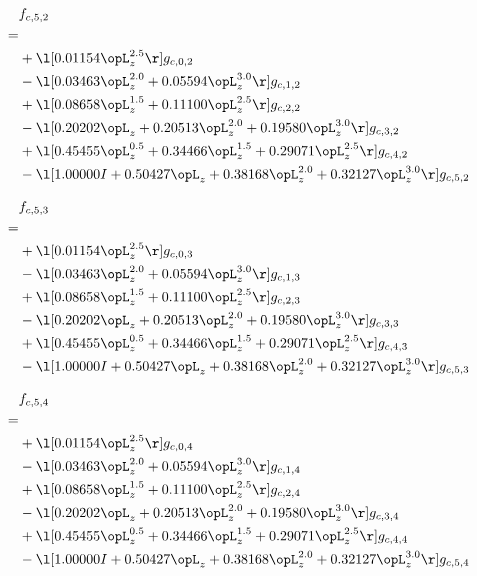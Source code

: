 \begin{alignat}{2} 
\label{eq:f_52_0} 
& f_{c,5,2} \nonumber \\ 
 = \\ 
& + \l[  0.01154 \opL_z^{2.5}  \r] g_{c,0,2} \nonumber \\ 
& - \l[  0.03463 \opL_z^{2.0} +  0.05594 \opL_z^{3.0}  \r] g_{c,1,2} \nonumber \\ 
& + \l[  0.08658 \opL_z^{1.5} +  0.11100 \opL_z^{2.5}  \r] g_{c,2,2} \nonumber \\ 
& - \l[  0.20202 \opL_z +  0.20513 \opL_z^{2.0} +  0.19580 \opL_z^{3.0}  \r] g_{c,3,2} \nonumber \\ 
& + \l[  0.45455 \opL_z^{0.5} +  0.34466 \opL_z^{1.5} +  0.29071 \opL_z^{2.5}  \r] g_{c,4,2} \nonumber \\ 
& - \l[  1.00000 I +  0.50427 \opL_z +  0.38168 \opL_z^{2.0} +  0.32127 \opL_z^{3.0}  \r] g_{c,5,2} \nonumber \\ 
\end{alignat} 


\begin{alignat}{2} 
\label{eq:f_53_0} 
& f_{c,5,3} \nonumber \\ 
 = \\ 
& + \l[  0.01154 \opL_z^{2.5}  \r] g_{c,0,3} \nonumber \\ 
& - \l[  0.03463 \opL_z^{2.0} +  0.05594 \opL_z^{3.0}  \r] g_{c,1,3} \nonumber \\ 
& + \l[  0.08658 \opL_z^{1.5} +  0.11100 \opL_z^{2.5}  \r] g_{c,2,3} \nonumber \\ 
& - \l[  0.20202 \opL_z +  0.20513 \opL_z^{2.0} +  0.19580 \opL_z^{3.0}  \r] g_{c,3,3} \nonumber \\ 
& + \l[  0.45455 \opL_z^{0.5} +  0.34466 \opL_z^{1.5} +  0.29071 \opL_z^{2.5}  \r] g_{c,4,3} \nonumber \\ 
& - \l[  1.00000 I +  0.50427 \opL_z +  0.38168 \opL_z^{2.0} +  0.32127 \opL_z^{3.0}  \r] g_{c,5,3} \nonumber \\ 
\end{alignat} 


\begin{alignat}{2} 
\label{eq:f_54_0} 
& f_{c,5,4} \nonumber \\ 
 = \\ 
& + \l[  0.01154 \opL_z^{2.5}  \r] g_{c,0,4} \nonumber \\ 
& - \l[  0.03463 \opL_z^{2.0} +  0.05594 \opL_z^{3.0}  \r] g_{c,1,4} \nonumber \\ 
& + \l[  0.08658 \opL_z^{1.5} +  0.11100 \opL_z^{2.5}  \r] g_{c,2,4} \nonumber \\ 
& - \l[  0.20202 \opL_z +  0.20513 \opL_z^{2.0} +  0.19580 \opL_z^{3.0}  \r] g_{c,3,4} \nonumber \\ 
& + \l[  0.45455 \opL_z^{0.5} +  0.34466 \opL_z^{1.5} +  0.29071 \opL_z^{2.5}  \r] g_{c,4,4} \nonumber \\ 
& - \l[  1.00000 I +  0.50427 \opL_z +  0.38168 \opL_z^{2.0} +  0.32127 \opL_z^{3.0}  \r] g_{c,5,4} \nonumber \\ 
\end{alignat} 


